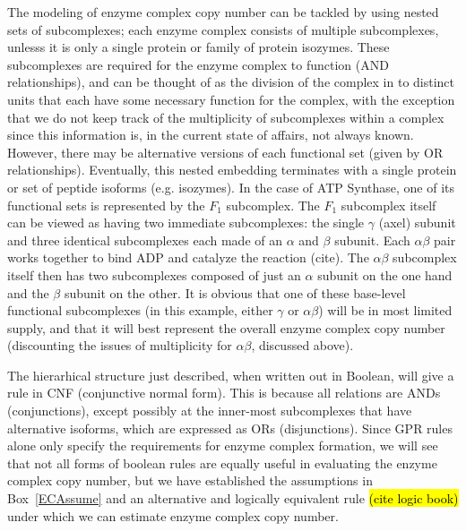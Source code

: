 The modeling of enzyme complex copy number can be tackled by using
nested sets of subcomplexes; each enzyme complex consists of multiple
subcomplexes, unlesss it is only a single protein or family of protein
isozymes.  These subcomplexes are required for the enzyme complex to
function (AND relationships), and can be thought of as the division of
the complex in to distinct units that each have some necessary
function for the complex, with the exception that we do not keep track
of the multiplicity of subcomplexes within a complex since this
information is, in the current state of affairs, not always known.
However, there may be alternative versions of each functional set
(given by OR relationships). Eventually, this nested embedding
terminates with a single protein or set of peptide isoforms
(e.g. isozymes).  In the case of ATP Synthase, one of its functional
sets is represented by the $F_1$ subcomplex. The $F_1$ subcomplex
itself can be viewed as having two immediate subcomplexes: the single
$\gamma$ (axel) subunit and three identical subcomplexes each made of
an $\alpha$ and $\beta$ subunit. Each $\alpha\beta$ pair works
together to bind ADP and catalyze the reaction (cite). The
$\alpha\beta$ subcomplex itself then has two subcomplexes composed of
just an $\alpha$ subunit on the one hand and the $\beta$ subunit on
the other.  It is obvious that one of these base-level functional
subcomplexes (in this example, either $\gamma$ or $\alpha\beta$) will
be in most limited supply, and that it will best represent the overall
enzyme complex copy number (discounting the issues of multiplicity for
$\alpha\beta$, discussed above).

%
%

The hierarhical structure just described, when written out in Boolean,
will give a rule in CNF (conjunctive normal form). This is because all
relations are ANDs (conjunctions), except possibly at the inner-most
subcomplexes that have alternative isoforms, which are expressed as
ORs (disjunctions). Since GPR rules alone only specify the
requirements for enzyme complex formation, we will see that not all
forms of boolean rules are equally useful in evaluating the enzyme
complex copy number, but we have established the assumptions in
Box~\ref{ECAssume} and an alternative and logically equivalent rule
\hl{(cite logic book)} under which we can estimate enzyme complex copy
number.

